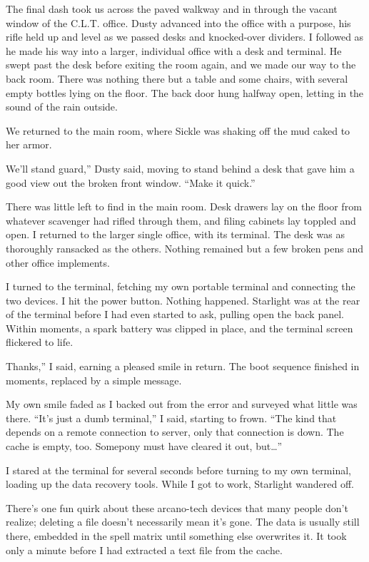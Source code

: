 The final dash took us across the paved walkway and in through the vacant window of the C.L.T. office. Dusty advanced into the office with a purpose, his rifle held up and level as we passed desks and knocked-over dividers. I followed as he made his way into a larger, individual office with a desk and terminal. He swept past the desk before exiting the room again, and we made our way to the back room. There was nothing there but a table and some chairs, with several empty bottles lying on the floor. The back door hung halfway open, letting in the sound of the rain outside.

We returned to the main room, where Sickle was shaking off the mud caked to her armor.

\leavevmode{}We’ll stand guard,” Dusty said, moving to stand behind a desk that gave him a good view out the broken front window. “Make it quick.”

There was little left to find in the main room. Desk drawers lay on the floor from whatever scavenger had rifled through them, and filing cabinets lay toppled and open. I returned to the larger single office, with its terminal. The desk was as thoroughly ransacked as the others. Nothing remained but a few broken pens and other office implements.

I turned to the terminal, fetching my own portable terminal and connecting the two devices. I hit the power button. Nothing happened. Starlight was at the rear of the terminal before I had even started to ask, pulling open the back panel. Within moments, a spark battery was clipped in place, and the terminal screen flickered to life.

\leavevmode{}Thanks,” I said, earning a pleased smile in return. The boot sequence finished in moments, replaced by a simple message.


My own smile faded as I backed out from the error and surveyed what little was there. “It’s just a dumb terminal,” I said, starting to frown. “The kind that depends on a remote connection to server, only that connection is down. The cache is empty, too. Somepony must have cleared it out, but…”

I stared at the terminal for several seconds before turning to my own terminal, loading up the data recovery tools. While I got to work, Starlight wandered off.

There’s one fun quirk about these arcano-tech devices that many people don’t realize; deleting a file doesn’t necessarily mean it’s gone. The data is usually still there, embedded in the spell matrix until something else overwrites it. It took only a minute before I had extracted a text file from the cache.

